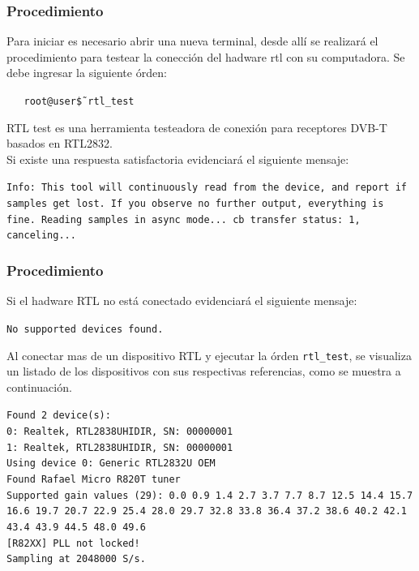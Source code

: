 \begin{frame}
\frametitle{Procedimiento}

Para iniciar es necesario abrir una nueva terminal, desde allí se realizará el procedimiento para testear la conección del hadware rtl con su computadora. \vspace{2mm}
Se debe ingresar la siguiente órden:

\begin{block}{}
    \texttt
    {\ \ \ root@user\~\$ rtl\_test}
    \end{block}

RTL test es una herramienta testeadora de conexión para receptores DVB-T basados en RTL2832. \\ \vspace{2mm}
Si existe una respuesta satisfactoria evidenciará el siguiente mensaje:

\begin{block}{}
    \texttt
    {Info: This tool will continuously read from the device, and report if samples get lost. If you observe no further output, everything is fine. Reading samples in async mode... cb transfer status: 1, canceling...}
    \end{block}

\end{frame}

\begin{frame}
\frametitle{Procedimiento}

Si el hadware RTL no está conectado evidenciará el siguiente mensaje:

\begin{block}{}
    \texttt
    {No supported devices found.}
    \end{block}

Al conectar mas de un dispositivo RTL y ejecutar la órden \texttt
    {rtl\_test}, se visualiza un listado de los dispositivos con sus respectivas referencias, como se muestra a continuación.
    
    \begin{block}{}
    \texttt
    {Found 2 device(s):\\
    0:  Realtek, RTL2838UHIDIR, SN: 00000001\\ 
    1:  Realtek, RTL2838UHIDIR, SN: 00000001\\
    Using device 0: Generic RTL2832U OEM\\ 
    Found Rafael Micro R820T tuner\\ 
    Supported gain values (29): 0.0 0.9 1.4 2.7 3.7 7.7 8.7 12.5 14.4 15.7 16.6 19.7 20.7 22.9 25.4 28.0 29.7 32.8 33.8 36.4 37.2 38.6 40.2 42.1 43.4 43.9 44.5 48.0 49.6\\
    {[R82XX]} PLL not locked!\\
    Sampling at 2048000 S/s. 
}
    \end{block}

\end{frame}

